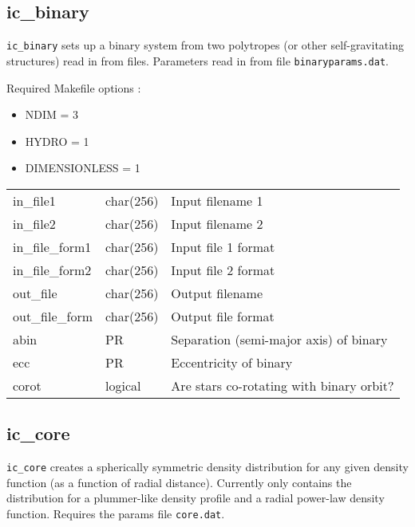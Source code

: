 \documentclass[a4paper]{article}
\newcommand{\var}[1]{\texttt{#1}}
\begin{document}
\newpage


\subsection{ic\_binary}
\var{ic\_binary} sets up a binary system from two polytropes (or other self-gravitating structures) read in from files.  Parameters read in from file \var{binaryparams.dat}. \newline

\noindent Required Makefile options :
\begin{itemize}
\item NDIM = 3
\item HYDRO = 1
\item DIMENSIONLESS = 1
\end{itemize}
\vspace{0.1cm}

\tabletail{\hline}
\tablelasttail{\hline}
\begin{center}
\begin{supertabular}{|p{3cm}|p{2cm}|p{8cm}|}
in\_file1        & char(256) & Input filename 1 \\
in\_file2        & char(256) & Input filename 2 \\
in\_file\_form1  & char(256) & Input file 1 format \\
in\_file\_form2  & char(256) & Input file 2 format \\
out\_file        & char(256) & Output filename \\
out\_file\_form  & char(256) & Output file format \\
abin             & PR        & Separation (semi-major axis) of binary \\
ecc		 & PR        & Eccentricity of binary \\
corot            & logical   & Are stars co-rotating with binary orbit? \\
\end{supertabular}
\end{center}



\subsection{ic\_core}
\var{ic\_core} creates a spherically symmetric density distribution for any given density function (as a function of radial distance).  Currently only contains the distribution for a plummer-like density profile and a radial power-law density function.  Requires the params file \var{core.dat}. \newline
\end{document}
